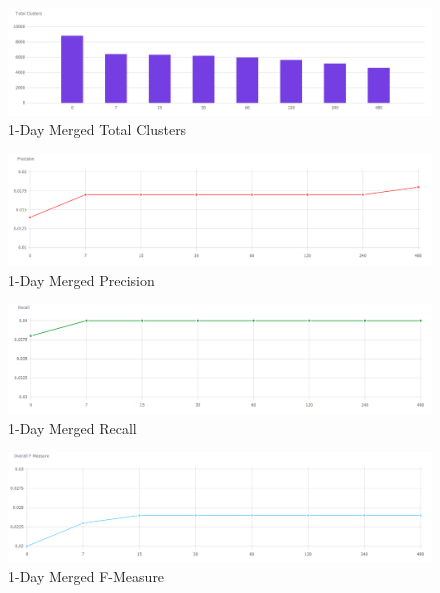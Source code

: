 \documentclass[a4paper,portrait,12pt]{article}
\begin{document}
\begin{figure}[H]
	\centering
	\includegraphics[width=\linewidth]{images/1day-merged-total-clusters.png}
	\caption{1-Day Merged Total Clusters}
	\label{fig:1day-merged-total-clusters}
\end{figure}

\begin{figure}[H]
	\centering
	\includegraphics[width=\linewidth]{images/1day-merged-precision.png}
	\caption{1-Day Merged Precision}
	\label{fig:1day-merged-precision}
\end{figure}

\begin{figure}[H]
	\centering
	\includegraphics[width=\linewidth]{images/1day-merged-recall.png}
	\caption{1-Day Merged Recall}
	\label{fig:1day-merged-recall}
\end{figure}

\begin{figure}[H]
	\centering
	\includegraphics[width=\linewidth]{images/1day-merged-f-measure.png}
	\caption{1-Day Merged F-Measure}
	\label{fig:1day-merged-f-measure}
\end{figure}
\end{document}
